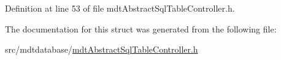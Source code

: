 Definition at line 53 of file mdt\-Abstract\-Sql\-Table\-Controller.\-h.



The documentation for this struct was generated from the following file\-:\begin{DoxyCompactItemize}
\item 
src/mdtdatabase/\hyperlink{mdt_abstract_sql_table_controller_8h}{mdt\-Abstract\-Sql\-Table\-Controller.\-h}\end{DoxyCompactItemize}
